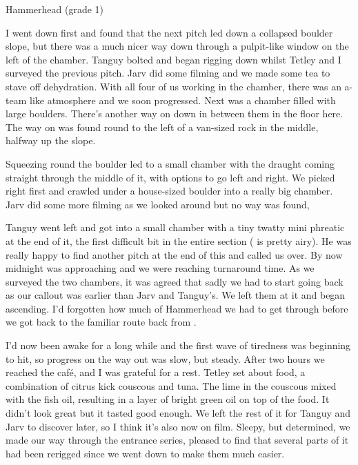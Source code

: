 \begin{survey}[t!]
\checkoddpage \ifoddpage \forcerectofloat \else \forceversofloat \fi
 \centering
{}
\caption[Hammerhead plan (grade 1)]{Hammerhead (grade 1) }
\end{survey}

I went down first and found that the next pitch led down a collapsed boulder slope, but there was a much nicer way down through a pulpit-like window on the left of the chamber. Tanguy bolted and began rigging down whilst Tetley and I surveyed the previous pitch. Jarv did some filming and we made some tea to stave off dehydration. With all four of us working in the chamber, there was an a-team like atmosphere and we soon progressed. Next was a chamber filled with large boulders. There's another way on down in between them in the floor here. The way on was found round to the left of a van-sized rock in the middle, halfway up the slope.

Squeezing round the boulder led to a small chamber with the draught coming straight through the middle of it, with options to go left and right. We picked right first and crawled under a house-sized boulder into a really big chamber. Jarv did some more filming as we looked around but no way was found,  

Tanguy went left and got into a small chamber with a tiny twatty mini phreatic at the end of it, the first difficult bit in the entire section ( is pretty airy). He was really happy to find another pitch at the end of this and called us over. By now midnight was approaching and we were reaching turnaround time. As we surveyed the two chambers, it was agreed that sadly we had to start going back as our callout was earlier than Jarv and Tanguy's. We left them at it and began ascending. I'd forgotten how much of Hammerhead we had to get through before we got back to the familiar route back from .

I'd now been awake for a long while and the first wave of tiredness was beginning to hit, so progress on the way out was slow, but steady. After two hours we reached the café, and I was grateful for a rest. Tetley set about food, a combination of citrus kick couscous and tuna. The lime in the couscous mixed with the fish oil, resulting in a layer of bright green oil on top of the food. It didn't look great but it tasted good enough. We left the rest of it for Tanguy and Jarv to discover later, so I think it's also now on film.  Sleepy, but determined, we made our way through the entrance series, pleased to find that several parts of it had been rerigged since we went down to make them much easier. 

